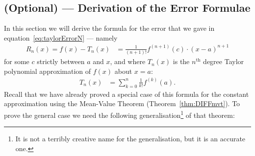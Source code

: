 \subsection{(Optional) --- Derivation of the Error Formulae}\label{subsec:GMVT}
In this section we will derive the formula for the error that we gave in
equation~\eqref{eq:taylorErrorN} --- namely
\begin{align*}
  R_n(x) = f(x) - T_n(x) &= \frac{1}{(n+1)!}f^{(n+1)}(c)\cdot (x-a)^{n+1}
\end{align*}
for some $c$ strictly between $a$ and $x$, and where $T_n(x)$ is the $n^\mathrm{th}$
degree Taylor polynomial approximation of $f(x)$ about $x=a$:
\begin{align*}
  T_n(x) &= \sum_{k=0}^n \frac{1}{k!} f^{(k)}(a).
\end{align*}
Recall that we have already proved a special case of this formula for the constant
approximation using the Mean-Value Theorem (Theorem~\ref{thm:DIFFmvt}). To prove the
general case we need the following generalisation\footnote{It is not a terribly creative
name for the generalisation, but it is an accurate one.} of that theorem:

